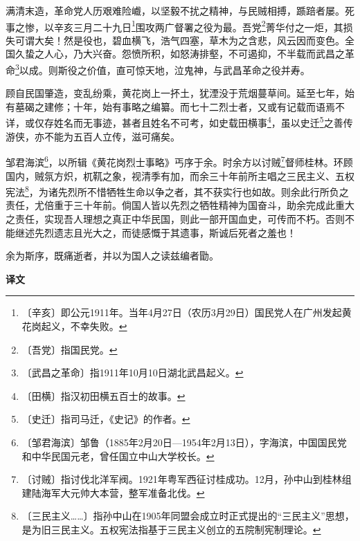 \documentclass[12pt,UTF-8,openany,a4]{ctexbook}
\begin{document}
\begin{large}
    
    满清末造，革命党人历艰难险巇，以坚毅不扰之精神，与民贼相搏，踬踣者屡。死事之惨，以辛亥三月二十九日\footnote{〔辛亥〕\yiwen 即公元1911年。当年4月27日（农历3月29日）国民党人在广州发起黄花岗起义，不幸失败。}围攻两广督署之役为最。吾党\footnote{〔吾党〕\yiwen 指国民党。}菁华付之一炬，其损失可谓大矣！然是役也，碧血横飞，浩气四塞，草木为之含悲，风云因而变色。全国久蛰之人心，乃大兴奋。怨愤所积，如怒涛排壑，不可遏抑，不半载而武昌之革命\footnote{〔武昌之革命〕\yiwen 指1911年10月10日湖北武昌起义。}以成。则斯役之价值，直可惊天地，泣鬼神，与武昌革命之役并寿。
    
    顾自民国肇造，变乱纷乘，黄花岗上一抔土，犹湮没于荒烟蔓草间。延至七年，始有墓碣之建修；十年，始有事略之编纂。而七十二烈士者，又或有记载而语焉不详，或仅存姓名而无事迹，甚者且姓名不可考，如史载田横事\footnote{〔田横〕\yiwen 指汉初田横五百士的故事。}，虽以史迁\footnote{〔史迁〕\yiwen 指司马迁，《史记》的作者。}之善传游侠，亦不能为五百人立传，滋可痛矣。
    
    邹君海滨\footnote{〔邹君海滨〕\yiwen 邹鲁（1885年2月20日—1954年2月13日），字海滨，中国国民党和中华民国元老，曾任国立中山大学校长。}，以所辑《黄花岗烈士事略》丐序于余。时余方以讨贼\footnote{〔讨贼〕\yiwen 指讨伐北洋军阀。1921年粤军西征讨桂成功。12月，孙中山到桂林组建陆海军大元帅大本营，整军准备北伐。}督师桂林。环顾国内，贼氛方炽，杌靰之象，视清季有加，而余三十年前所主唱之三民主义、五权宪法\footnote{〔三民主义……〕\yiwen 指孙中山在1905年同盟会成立时正式提出的“三民主义”思想，是为旧三民主义。五权宪法指基于三民主义创立的五院制宪制理论。}，为诸先烈所不惜牺牲生命以争之者，其不获实行也如故。则余此行所负之责任，尤倍重于三十年前。倘国人皆以先烈之牺牲精神为国奋斗，助余完成此重大之责任，实现吾人理想之真正中华民国，则此一部开国血史，可传而不朽。否则不能继述先烈遗志且光大之，而徒感慨于其遗事，斯诚后死者之羞也！
    
    余为斯序，既痛逝者，并以为国人之读兹编者勖。
\end{large}


\newpage

\begin{Large}
    \noindent\textbf{译文}
\end{Large}


\vspace{1em}
\end{document}
